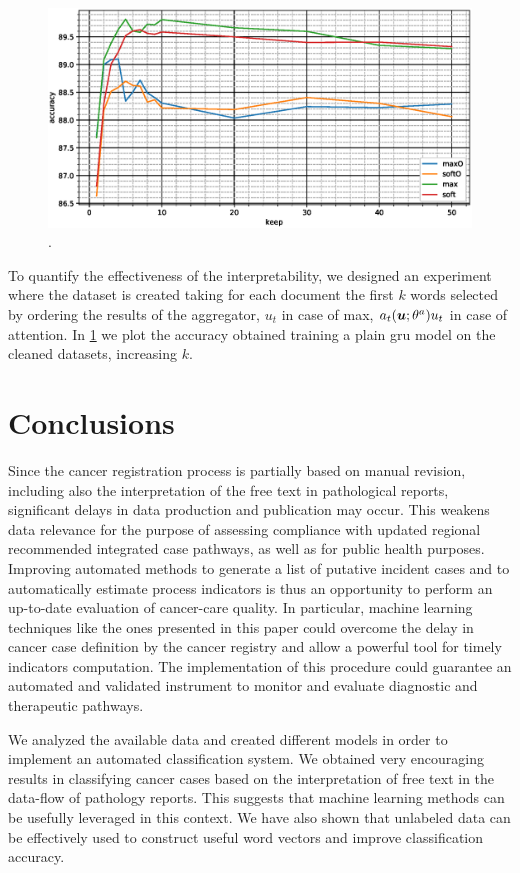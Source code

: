 \begin{figure}
  \centering
  \includegraphics[width=\floatwidth]{img/plotSintex.eps}
  \caption{.}
  \label{fig:sintex}
\end{figure}
To quantify the effectiveness of the interpretability, we designed an
experiment where the dataset is created taking for each document the
first $k$ words selected by  
ordering the results of the aggregator, $u_t$ in case of max,
$a_t(\bm{u};\theta^a)u_t$ in case of attention. In \cref{fig:sintex}
we plot the accuracy obtained training a plain \ac{gru} model on the
cleaned datasets, increasing $k$. 

\section{Conclusions}
Since the cancer registration process is partially based on manual
revision, including also the interpretation of the free text in
pathological reports, significant delays in data production and
publication may occur. This weakens data relevance for the purpose of
assessing compliance with updated regional recommended integrated case
pathways, as well as for public health purposes. Improving automated
methods to generate a list of putative incident cases and to
automatically estimate process indicators is thus an opportunity to
perform an up-to-date evaluation of cancer-care quality. In
particular, machine learning techniques like the ones presented in
this paper could overcome the delay in cancer case definition by the
cancer registry and allow a powerful tool for timely indicators
computation. The implementation of this procedure could guarantee an
automated and validated instrument to monitor and evaluate diagnostic
and therapeutic pathways.

We analyzed the available data and created different models in order
to implement an automated classification system. We obtained very
encouraging results in classifying cancer cases based on the
interpretation of free text in the data-flow of pathology
reports. This suggests that machine learning methods can be usefully
leveraged in this context.  We have also shown that unlabeled data can
be effectively used to construct useful word vectors and improve
classification accuracy. 

